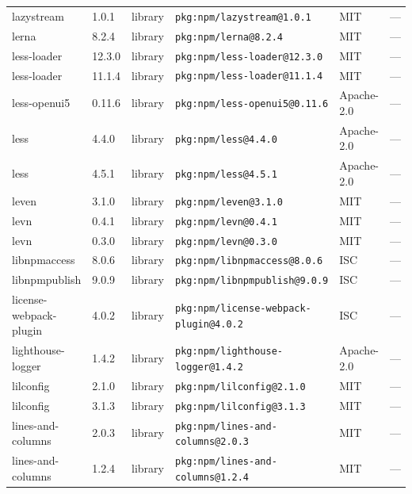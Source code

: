 \documentclass[11pt,a4paper]{article}
\begin{document}
\begin{longtable}{|p{4cm}|p{2cm}|p{1.6cm}|p{5cm}|p{1.5cm}|p{3.5cm}|}
\raggedright lazystream & 1.0.1 & library & \small\texttt{pkg:npm/lazystream@1.0.1} & MIT & \small — \\
\raggedright lerna & 8.2.4 & library & \small\texttt{pkg:npm/lerna@8.2.4} & MIT & \small — \\
\raggedright less-loader & 12.3.0 & library & \small\texttt{pkg:npm/less-loader@12.3.0} & MIT & \small — \\
\raggedright less-loader & 11.1.4 & library & \small\texttt{pkg:npm/less-loader@11.1.4} & MIT & \small — \\
\raggedright less-openui5 & 0.11.6 & library & \small\texttt{pkg:npm/less-openui5@0.11.6} & Apache-2.0 & \small — \\
\raggedright less & 4.4.0 & library & \small\texttt{pkg:npm/less@4.4.0} & Apache-2.0 & \small — \\
\raggedright less & 4.5.1 & library & \small\texttt{pkg:npm/less@4.5.1} & Apache-2.0 & \small — \\
\raggedright leven & 3.1.0 & library & \small\texttt{pkg:npm/leven@3.1.0} & MIT & \small — \\
\raggedright levn & 0.4.1 & library & \small\texttt{pkg:npm/levn@0.4.1} & MIT & \small — \\
\raggedright levn & 0.3.0 & library & \small\texttt{pkg:npm/levn@0.3.0} & MIT & \small — \\
\raggedright libnpmaccess & 8.0.6 & library & \small\texttt{pkg:npm/libnpmaccess@8.0.6} & ISC & \small — \\
\raggedright libnpmpublish & 9.0.9 & library & \small\texttt{pkg:npm/libnpmpublish@9.0.9} & ISC & \small — \\
\raggedright license-webpack-plugin & 4.0.2 & library & \small\texttt{pkg:npm/license-webpack-plugin@4.0.2} & ISC & \small — \\
\raggedright lighthouse-logger & 1.4.2 & library & \small\texttt{pkg:npm/lighthouse-logger@1.4.2} & Apache-2.0 & \small — \\
\raggedright lilconfig & 2.1.0 & library & \small\texttt{pkg:npm/lilconfig@2.1.0} & MIT & \small — \\
\raggedright lilconfig & 3.1.3 & library & \small\texttt{pkg:npm/lilconfig@3.1.3} & MIT & \small — \\
\raggedright lines-and-columns & 2.0.3 & library & \small\texttt{pkg:npm/lines-and-columns@2.0.3} & MIT & \small — \\
\raggedright lines-and-columns & 1.2.4 & library & \small\texttt{pkg:npm/lines-and-columns@1.2.4} & MIT & \small — \\

\end{longtable}
\end{document}
